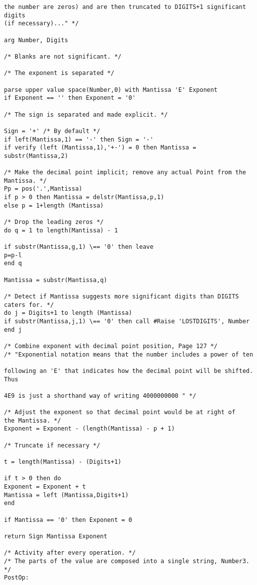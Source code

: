 \begin{verbatim}
the number are zeros) and are then truncated to DIGITS+1 significant digits
(if necessary)..." */

arg Number, Digits

/* Blanks are not significant. */

/* The exponent is separated */

parse upper value space(Number,0) with Mantissa 'E' Exponent
if Exponent == '' then Exponent = '0'

/* The sign is separated and made explicit. */

Sign = '+' /* By default */
if left(Mantissa,1) == '-' then Sign = '-'
if verify (left (Mantissa,1),'+-') = 0 then Mantissa = substr(Mantissa,2)

/* Make the decimal point implicit; remove any actual Point from the
Mantissa. */
Pp = pos('.',Mantissa)
if p > 0 then Mantissa = delstr(Mantissa,p,1)
else p = 1+length (Mantissa)

/* Drop the leading zeros */
do q = 1 to length(Mantissa) - 1

if substr(Mantissa,g,1) \== '0' then leave
p=p-l
end q

Mantissa = substr(Mantissa,q)

/* Detect if Mantissa suggests more significant digits than DIGITS
caters for. */
do j = Digits+1 to length (Mantissa)
if substr(Mantissa,j,1) \== '0' then call #Raise 'LOSTDIGITS', Number
end j

/* Combine exponent with decimal point position, Page 127 */
/* "Exponential notation means that the number includes a power of ten

following an 'E' that indicates how the decimal point will be shifted. Thus

4E9 is just a shorthand way of writing 4000000000 " */

/* Adjust the exponent so that decimal point would be at right of
the Mantissa. */
Exponent = Exponent - (length(Mantissa) - p + 1)

/* Truncate if necessary */

t = length(Mantissa) - (Digits+1)

if t > 0 then do
Exponent = Exponent + t
Mantissa = left (Mantissa,Digits+1)
end

if Mantissa == '0' then Exponent = 0

return Sign Mantissa Exponent

/* Activity after every operation. */
/* The parts of the value are composed into a single string, Number3. */
PostOp:


\end{verbatim}
